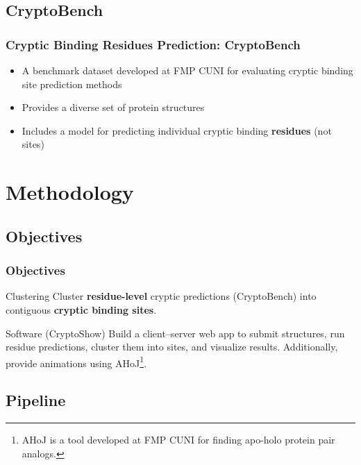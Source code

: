 \documentclass[aspectratio=169]{beamer}
\begin{document}
\subsection{CryptoBench}

\begin{frame}
  \frametitle{Cryptic Binding Residues Prediction: CryptoBench}
  \begin{itemize}
    \item A benchmark dataset developed at FMP CUNI for evaluating cryptic binding site prediction methods
    \item Provides a diverse set of protein structures
    \item Includes a model for predicting individual cryptic binding \textbf{residues} (not sites)
  \end{itemize}

\end{frame}

\section{Methodology}
\subsection{Objectives}

\begin{frame}
  \frametitle{Objectives}
  \begin{block}{Clustering}
    Cluster \textbf{residue-level} cryptic predictions (CryptoBench) into contiguous \textbf{cryptic binding sites}.
  \end{block}

  \begin{block}{Software (CryptoShow)}
    Build a client–server web app to submit structures, run residue predictions, cluster them into sites, and visualize results. Additionally, provide animations using AHoJ\footnote{AHoJ is a tool developed at FMP CUNI for finding apo-holo protein pair analogs.}.
  \end{block}
\end{frame}

\subsection{Pipeline}
\end{document}
